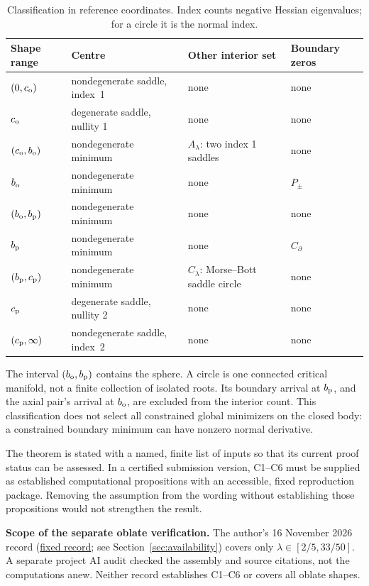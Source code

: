 \begin{table}[htbp]\centering\small
\caption{Classification in reference coordinates. Index counts negative Hessian eigenvalues; for a circle it is the normal index.}\label{tab:classification}
\begin{tabularx}{\linewidth}{@{}lXXX@{}}\toprule
Shape range & Centre & Other interior set & Boundary zeros\\\midrule
$(0,c_{\mathrm o})$ & nondegenerate saddle, \mbox{index 1} & none & none\\
$c_{\mathrm o}$ & degenerate saddle, nullity 1 & none & none\\
$(c_{\mathrm o},b_{\mathrm o})$ & nondegenerate minimum & $A_\lambda$: two index 1 saddles & none\\
$b_{\mathrm o}$ & nondegenerate minimum & none & $P_\pm$\\
$(b_{\mathrm o},b_{\mathrm p})$ & nondegenerate minimum & none & none\\
$b_{\mathrm p}$ & nondegenerate minimum & none & $C_\partial$\\
$(b_{\mathrm p},c_{\mathrm p})$ & nondegenerate minimum & $C_\lambda$: Morse--Bott saddle circle & none\\
$c_{\mathrm p}$ & degenerate saddle, nullity 2 & none & none\\
$(c_{\mathrm p},\infty)$ & nondegenerate saddle, \mbox{index 2} & none & none\\\bottomrule
\end{tabularx}
\end{table}

The interval $(b_{\mathrm o},b_{\mathrm p})$ contains the sphere. A circle is one connected critical manifold, not a finite collection of isolated roots. Its boundary arrival at $b_{\mathrm p}$, and the axial pair's arrival at $b_{\mathrm o}$, are excluded from the interior count. This classification does not select all constrained global minimizers on the closed body: a constrained boundary minimum can have nonzero normal derivative.

The theorem is stated with a named, finite list of inputs so that its current proof status can be assessed. In a certified submission version, C1--C6 must be supplied as established computational propositions with an accessible, fixed reproduction package. Removing the assumption from the wording without establishing those propositions would not strengthen the result.

\noindent\textbf{Scope of the separate oblate verification.}
The author's 16 November 2026 record
(\href{https://github.com/cotaxxxx/bg-spheroid-family/blob/127be52046e9498d1306fe3d35c3e02e91c636de/runs/2026-11-16/D_OB_GLOBAL_CLOSED_V24/JUDGE_RULING_D_OB_GLOBAL_CLOSED_20261116.md}{fixed record}; see Section~\ref{sec:availability})
covers only $\lambda\in[2/5,33/50]$.
A separate project AI audit checked the assembly and source citations,
not the computations anew. Neither record establishes C1--C6 or
covers all oblate shapes.

